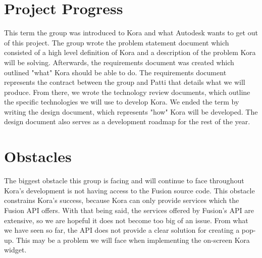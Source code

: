 \documentclass[onecolumn, draftclsnofoot,10pt, compsoc]{IEEEtran}
\begin{document}
\section{Project Progress}
	This term the group was introduced to Kora and what Autodesk wants to get out of this project.
	The group wrote the problem statement document which consisted of a high level definition of Kora and a description of the problem Kora will be solving.
	Afterwards, the requirements document was created which outlined "what" Kora should be able to do.
	The requirements document represents the contract between the group and Patti that details what we will produce.
	From there, we wrote the technology review documents, which outline the specific technologies we will use to develop Kora.
	We ended the term by writing the design document, which represents "how" Kora will be developed.
	The design document also serves as a development roadmap for the rest of the year.
	

\section{Obstacles}
	The biggest obstacle this group is facing and will continue to face throughout Kora's development is not having access to the Fusion source code.
	This obstacle constrains Kora's success, because Kora can only provide services which the Fusion API offers.
	With that being said, the services offered by Fusion's API are extensive, so we are hopeful it does not become too big of an issue.
	From what we have seen so far, the API does not provide a clear solution for creating a pop-up.
	This may be a problem we will face when implementing the on-screen Kora widget.
	
	
\end{document}

